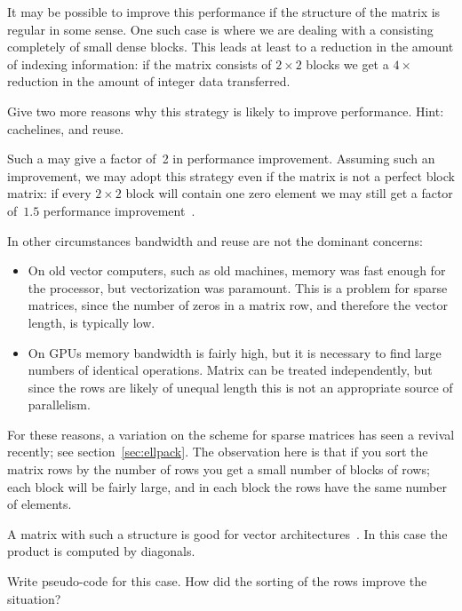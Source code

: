 It may be possible to improve this performance if the structure of the
matrix is regular in some sense. One such case is where we are dealing
with a  consisting completely of small dense
blocks. This leads at least to a reduction in the amount of indexing
information: if the matrix consists of $2\times2$ blocks we get a
$4\times$ reduction in the amount of integer data transferred.
\begin{exercise}
  Give two more reasons why this strategy is likely to improve
  performance. Hint: cachelines, and reuse.
\end{exercise}
Such a  may give a factor of~2 in
performance improvement. Assuming such an improvement, we may adopt
this strategy even if the matrix is not a perfect block matrix: if
every $2\times2$ block will contain one zero element we may still get
a factor of~$1.5$ performance
improvement~\cite{vuduc:thesis,ButtEijkLang:spmvp}.


In other circumstances bandwidth and reuse are not the dominant concerns:
\begin{itemize}
\item On old vector computers, such as old  machines,
  memory was fast enough for the processor, but vectorization was
  paramount. This is a problem for sparse matrices, since the number
  of zeros in a matrix row, and therefore the vector length, is
  typically low.
\item On \acp{GPU} memory bandwidth is fairly high, but it is
  necessary to find large numbers of identical operations. Matrix can
  be treated independently, but since the rows are likely of unequal
  length this is not an appropriate source of parallelism.
\end{itemize}
For these reasons, a variation on the 
scheme for sparse matrices has seen a revival
recently; see section~\ref{sec:ellpack}.
The observation here is that
if you sort the matrix rows by the number of rows you get a small
number of blocks of rows; each block will be fairly large, and in each
block the rows have the same number of elements.

A matrix with such a structure is good for vector
architectures~\cite{DAzevedo2005:vector-mvp}. In this case the product
is computed by diagonals.
\begin{exercise}
  Write pseudo-code for this case. How did the sorting of the rows
  improve the situation?
\end{exercise}

